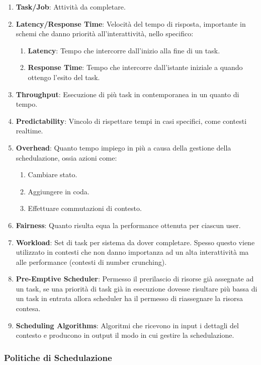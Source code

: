 \documentclass{article}
\begin{document}
\begin{enumerate}
    \item \textbf{Task/Job}: Attività da completare.
    \item \textbf{Latency/Response Time}: Velocità del tempo di risposta, importante in schemi che danno priorità all'interattività, nello specifico:
    \begin{enumerate}
        \item \textbf{Latency}: Tempo che intercorre dall'inizio alla fine di un task.
        \item \textbf{Response Time}: Tempo che intercorre dall'istante iniziale a quando ottengo l'esito del task.
    \end{enumerate}
    \item \textbf{Throughput}: Esecuzione di più task in contemporanea in un quanto di tempo.
    \item \textbf{Predictability}: Vincolo di rispettare tempi in casi specifici, come contesti realtime.
    \item \textbf{Overhead}: Quanto tempo impiego in più a causa della gestione della schedulazione, ossia azioni come:
    \begin{enumerate}
        \item Cambiare stato.
        \item Aggiungere in coda.
        \item Effettuare commutazioni di contesto.
    \end{enumerate}
    \item \textbf{Fairness}: Quanto risulta equa la performance ottenuta per ciascun user.
    \item \textbf{Workload}: Set di task per sistema da dover completare. Spesso questo viene utilizzato in contesti che non danno importanza ad un alta interattività ma alle performance (contesti di number crunching).
\newpage
    \item \textbf{Pre-Emptive Scheduler}: Permesso il prerilascio di risorse già assegnate ad un task, se una priorità di task già in esecuzione dovesse risultare più bassa di un task in entrata allora
    scheduler ha il permesso di riassegnare la risorsa contesa.
    \item \textbf{Scheduling Algorithms}: Algoritmi che ricevono in input i dettagli del contesto e producono in output il modo in cui gestire la schedulazione.
\end{enumerate}

\subsubsection{Politiche di Schedulazione}
\end{document}
